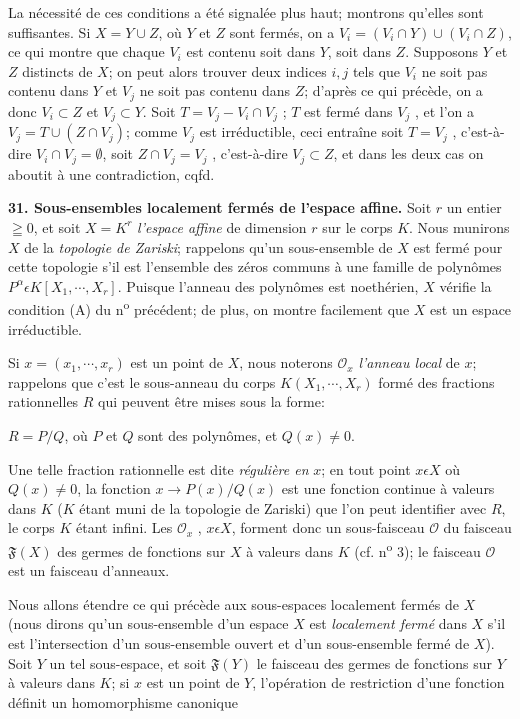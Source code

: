 
La nécessité de ces conditions a été signalée plus haut; montrons qu'elles sont suffisantes. Si $X = Y \cup Z$, où $Y$ et $Z$ sont fermés, on a $V_i = (V_i \cap Y) \cup (V_i \cap Z)$, ce qui montre que chaque $V_i$ est contenu soit dans $Y$, soit dans $Z$. Supposons $Y$ et $Z$ distincts de $X$; on peut alors trouver deux indices $i, j$ tels que $V_i$ ne soit pas contenu dans $Y$ et $V_j$ ne soit pas contenu dans $Z$; d'après ce qui précède, on a donc $V_i \subset Z$ et $V_j \subset Y$. Soit $T = V_j - V_i \cap V_j$ ; $T$ est fermé dans $V_j$ , et l'on a $V_j = T \cup (Z \cap V_j)$; comme $V_j$ est irréductible, ceci entraîne soit $T = V_j$ , c'est-à-dire $V_i \cap V_j = \emptyset$, soit $Z \cap V_j = V_j$ , c'est-à-dire $V_j \subset Z$, et dans les deux cas on aboutit à une contradiction, cqfd.

\textbf{31. Sous-ensembles localement fermés de l'espace affine.} Soit $r$ un entier $\geqq 0$, et soit $X = K^r$ \textit{l'espace affine} de dimension $r$ sur le corps $K$. Nous munirons $X$ de la \textit{topologie de Zariski}; rappelons qu'un sous-ensemble de $X$ est fermé pour cette topologie s'il est l'ensemble des zéros communs à une famille de polynômes $P^\alpha \epsilon K[X_1 , \cdots , X_r]$. Puisque l'anneau des polynômes est noethérien, $X$ vérifie la condition (A) du n\textsuperscript{o} précédent; de plus, on montre facilement que $X$ est un espace irréductible.

Si $x = (x_1 , \cdots , x_r)$ est un point de $X$, nous noterons $\mathcal{O}_x$ \textit{l'anneau local} de $x$; rappelons que c'est le sous-anneau du corps $K(X_1 , \cdots , X_r)$ formé des fractions rationnelles $R$ qui peuvent être mises sous la forme:

$R = P/Q$, où $P$ et $Q$ sont des polynômes, et $Q(x) \neq 0$.

Une telle fraction rationnelle est dite \textit{régulière en} $x$; en tout point $x \epsilon X$ où $Q(x) \neq 0$, la fonction $x \to P(x)/Q(x)$ est une fonction continue à valeurs dans $K$ ($K$ étant muni de la topologie de Zariski) que l'on peut identifier avec $R$, le corps $K$ étant infini. Les $\mathcal{O}_x$ , $x \epsilon X$, forment donc un sous-faisceau $\mathcal{O}$ du faisceau $\mathfrak{F}(X)$ des germes de fonctions sur $X$ à valeurs dans $K$ (cf. n\textsuperscript{o} 3); le faisceau $\mathcal{O}$ est un faisceau d'anneaux.

Nous allons étendre ce qui précède aux sous-espaces localement fermés de $X$ (nous dirons qu'un sous-ensemble d'un espace $X$ est \textit{localement fermé} dans $X$ s'il est l'intersection d'un sous-ensemble ouvert et d'un sous-ensemble fermé de $X$). Soit $Y$ un tel sous-espace, et soit $\mathfrak{F}(Y)$ le faisceau des germes de fonctions sur $Y$ à valeurs dans $K$; si $x$ est un point de $Y$, l'opération de restriction d'une fonction définit un homomorphisme canonique

